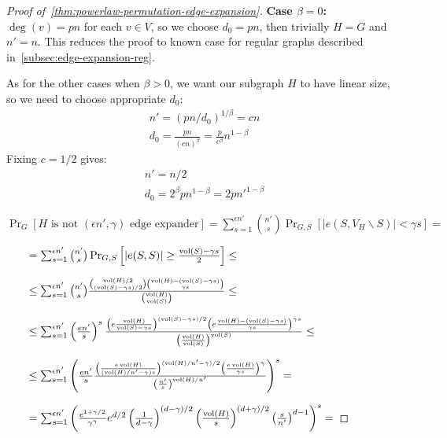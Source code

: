 \begin{proof}[Proof of~\autoref{thm:powerlaw-permutation-edge-expansion}]
    \textbf{Case $\beta=0$:}
    $\deg(v)=pn$ for each $v\in V$, so we choose $d_0=pn$, then trivially $H=G$ and $n'=n$.
    This reduces the proof to known case for regular graphs described in~\autoref{subsec:edge-expansion-reg}.
    
    As for the other cases when $\beta>0$, we want our subgraph $H$ to have linear size, so we need to choose appropriate $d_0$:
    \begin{gather*}
        n'=(pn/d_0)^{1/\beta}=cn\\
        d_0=\frac{pn}{(cn)^\beta}=\frac{p}{c^\beta}n^{1-\beta}
    \end{gather*}
    Fixing $c=1/2$ gives:
    \begin{gather*}
        n'=n/2\\
        d_0=2^\beta pn^{1-\beta}=2pn'^{1-\beta}
    \end{gather*}
    
    $\Pr_G[H\text{ is not }(\epsilon n',\gamma)\text{ edge expander}]
    =\sum_{s=1}^{\epsilon n'}{
        \binom{n'}{s}
        \Pr_{G,S}[|e(S,V_H\backslash S)| < \gamma s]
    }=$
    
    $\qquad=\sum_{s=1}^{\epsilon n'}{
        \binom{n'}{s}
        \Pr_{G,S}\left[|e(S,S)|\geq\frac{\operatorname*{vol}(S)-\gamma s}{2}\right]
    }\leq$
    
    $\qquad\leq\sum_{s=1}^{\epsilon n'}{
        \binom{n'}{s}
        \frac{\binom{\operatorname*{vol}(H)/2}{(\operatorname*{vol}(S)-\gamma s)/2}\binom{\operatorname*{vol}(H)-(\operatorname*{vol}(S)-\gamma s)}{\gamma s}}{\binom{\operatorname*{vol}(H)}{\operatorname*{vol}(S)}}
    }\leq$
    
    $\qquad\leq\sum_{s=1}^{\epsilon n'}{
        \left(\frac{en'}{s}\right)^s
        \frac{
            \left(e\frac{\operatorname*{vol}(H)}{\operatorname*{vol}(S)-\gamma s}\right)^{(\operatorname*{vol}(S)-\gamma s)/2}
            \left(e\frac{\operatorname*{vol}(H)-(\operatorname*{vol}(S)-\gamma s)}{\gamma s}\right)^{\gamma s}
        }
        {\left(\frac{\operatorname*{vol}(H)}{\operatorname*{vol}(S)}\right)^{\operatorname*{vol}(S)}}
    }\leq$
    
    $\qquad\leq\sum_{s=1}^{\epsilon n'}{\left(
        \frac{en'}{s}
        \frac{
            \left(\frac{e\operatorname*{vol}(H)}{(\operatorname*{vol}(H)/n'-\gamma)s}\right)^{(\operatorname*{vol}(H)/n'-\gamma)/2}
            \left(\frac{e\operatorname*{vol}(H)}{\gamma s}\right)^{\gamma}
        }
        {\left(\frac{n'}{s}\right)^{\operatorname*{vol}(H)/n'}}
    \right)^s}=$

    $\qquad=\sum_{s=1}^{\epsilon n'}{\left(
        \frac{e^{1+\gamma/2}}{\gamma^\gamma}
        e^{d/2}
        \left(\frac{1}{d-\gamma}\right)^{(d-\gamma)/2}
        \left(\frac{\operatorname*{vol}(H)}{s}\right)^{(d+\gamma)/2}
        \left(\frac{s}{n'}\right)^{d-1}
    \right)^s}=$


\end{proof}
